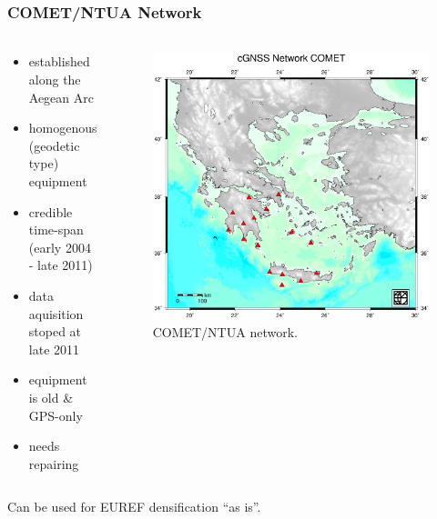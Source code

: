 \documentclass{beamer}
\begin{document}
\begin{frame}\frametitle{COMET/NTUA Network}\framesubtitle{}
\begin{columns}[T] %
\begin{column}{.40\textwidth}
  {\small
  \begin{itemize}
    \setlength\itemsep{.1em}
    \item<pro@1-> established along the Aegean Arc
    \item<pro@1-> homogenous (geodetic type) equipment
    \item<pro@1-> credible time-span (early 2004 - late 2011)
    \item<con@1-> data aquisition stoped at late 2011
    \item<con@1-> equipment is old \& GPS-only
    \item<con@1-> needs repairing
\end{itemize}
}
\end{column}%
\hfill%
\begin{column}{.60\textwidth}
 \begin{figure}
 \begin{center}
 \includegraphics[trim={1cm 2cm 1cm 2.5cm},clip,width=.9\textwidth]{img/comet.eps}
 \caption{COMET/NTUA network.}
 \label{fig:cometntua}
 \end{center}
 \end{figure}
\end{column}%
\end{columns}
  \begin{block}{}
    Can be used for EUREF densification ``as is''.
  \end{block}
\end{frame}
\end{document}
